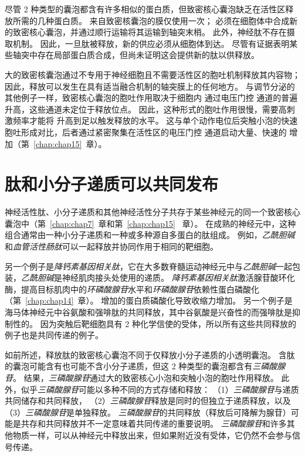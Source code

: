 尽管 2 种类型的囊泡都含有许多相似的蛋白质，但致密核心囊泡缺乏在活性区释放所需的几种蛋白质。
来自致密核囊泡的膜仅使用一次； 必须在细胞体中合成新的致密核心囊泡，并通过顺行运输将其运输到轴突末梢。
此外，神经肽不存在摄取机制。
因此，一旦肽被释放，新的供应必须从细胞体到达。
尽管有证据表明某些轴突中存在局部蛋白质合成，但尚未证明这会提供新的肽以供释放。


大的致密核囊泡通过不专用于神经细胞且不需要活性区的胞吐机制释放其内容物；
因此，释放可以发生在具有适当融合机制的轴突膜上的任何地方。
与调节分泌的其他例子一样，致密核心囊泡的胞吐作用取决于细胞内  通过电压门控  通道的普遍升高，这些通道未定位于释放位点。
因此，这种形式的胞吐作用很慢，需要高刺激频率才能将  升高到足以触发释放的水平。
这与单个动作电位后突触小泡的快速胞吐形成对比，后者通过紧密聚集在活性区的电压门控  通道启动大量、快速的  增加（第~\ref{chap:chap15}~章）。



\section{肽和小分子递质可以共同发布}

神经活性肽、小分子递质和其他神经活性分子共存于某些神经元的同一个致密核心囊泡中（第~\ref{chap:chap7}~章和第~\ref{chap:chap15} ~章）。
在成熟的神经元中，这种组合通常由一种小分子递质和一种或多种源自多蛋白的肽组成。
例如，\textit{乙酰胆碱}和\textit{血管活性肠肽}可以一起释放并协同作用于相同的靶细胞。


另一个例子是\textit{降钙素基因相关肽}，它在大多数脊髓运动神经元中与\textit{乙酰胆碱}一起包装，\textit{乙酰胆碱}是神经肌肉接头处使用的递质。
\textit{降钙素基因相关肽}激活腺苷酸环化酶，提高目标肌肉中的\textit{环磷酸腺苷}水平和\textit{环磷酸腺苷}依赖性蛋白磷酸化（第~\ref{chap:chap14}~章）。
增加的蛋白质磷酸化导致收缩力增加。
另一个例子是海马体神经元中谷氨酸和强啡肽的共同释放，其中谷氨酸是兴奋性的而强啡肽是抑制性的。
因为突触后靶细胞具有 2 种化学信使的受体，所以所有这些共同释放的例子也是共同传递的例子。


如前所述，释放肽的致密核心囊泡不同于仅释放小分子递质的小透明囊泡。
含肽的囊泡可能含有也可能不含小分子递质，但这 2 种类型的囊泡都含有\textit{三磷酸腺苷}。
结果，\textit{三磷酸腺苷}通过大的致密核心小泡和突触小泡的胞吐作用释放。
此外，似乎\textit{三磷酸腺苷}可能以多种不同的方式存储和释放：
（1）\textit{三磷酸腺苷}与递质共同储存和共同释放，
（2）\textit{三磷酸腺苷}释放是同时的但独立于递质释放，以及 
（3）\textit{三磷酸腺苷}是单独释放。
\textit{三磷酸腺苷}的共同释放（释放后可降解为腺苷）可能是共存和共同释放并不一定意味着共同传递的重要说明。
\textit{三磷酸腺苷}和许多其他物质一样，可以从神经元中释放出来，但如果附近没有受体，它仍然不会参与信号传递。


